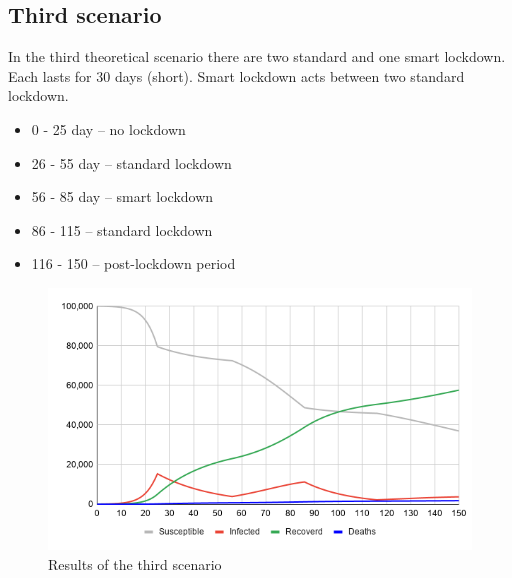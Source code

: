 \documentclass[12pt,a4paper,english]{article}
\begin{document}
    \subsection{Third scenario}
    \label{third_scenario}
    In the third theoretical scenario there are two standard and one smart lockdown.
    Each lasts for 30 days (short).
    Smart lockdown acts between two standard lockdown.
    \begin{itemize}
        \item 0 - 25 day -- no lockdown
        \item 26 - 55 day -- standard lockdown 
        \item 56 - 85 day -- smart lockdown
        \item 86 - 115 -- standard lockdown
        \item 116 - 150 -- post-lockdown period
    \end{itemize}
    \begin{figure}[h!]
        \centering
        \includegraphics[scale=0.55]{2short+smart.png}
        \caption{Results of the third scenario}
    \end{figure}
    
\end{document}

